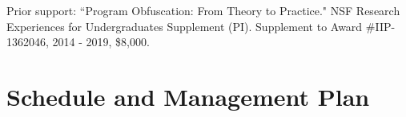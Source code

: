 \documentclass[11pt]{article}
\theoremstyle{remark}
\begin{document}
Prior support: ``Program Obfuscation: From Theory to Practice." NSF Research Experiences for Undergraduates Supplement (PI).
Supplement to Award \#IIP-1362046,   2014 - 2019, \$8,000.

\section{Schedule and Management Plan}



\end{document}
